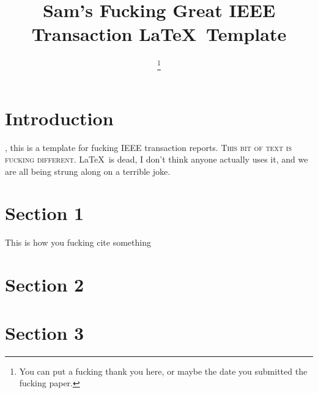 \documentclass[journal,transmag]{IEEEtran}
\begin{document}
\title{Sam's Fucking Great IEEE Transaction \LaTeX\ Template}

\author{

\thanks{You can put a fucking thank you here, or maybe the date you submitted the fucking paper.}}




\maketitle

\IEEEdisplaynontitleabstractindextext

\IEEEpeerreviewmaketitle

\section{Introduction}
 
, this is a template for fucking IEEE transaction reports. \textsc{This bit of text is fucking different.} \LaTeX\ is dead, I don't think anyone actually uses it, and we are all being strung along on a terrible joke.

\section{Section 1}
	\lipsum[1-2]
	This is how you fucking cite something \cite{mrx05}
	
\section{Section 2}
	\lipsum[3-5]

\section{Section 3}
	\lipsum[6-8]
\end{document}
